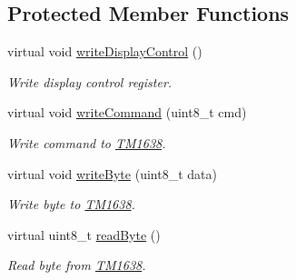 \subsection*{Protected Member Functions}
\begin{DoxyCompactItemize}
\item 
virtual void \hyperlink{class_t_m1638_a2ad9cd6d6c86595868f2c44d61cb1385}{write\+Display\+Control} ()
\begin{DoxyCompactList}\small\item\em Write display control register. \end{DoxyCompactList}\item 
virtual void \hyperlink{class_t_m1638_af72e7da067ca94440bacae4b09337d63}{write\+Command} (uint8\+\_\+t cmd)\hypertarget{class_t_m1638_af72e7da067ca94440bacae4b09337d63}{}\label{class_t_m1638_af72e7da067ca94440bacae4b09337d63}

\begin{DoxyCompactList}\small\item\em Write command to \hyperlink{class_t_m1638}{T\+M1638}. \end{DoxyCompactList}\item 
virtual void \hyperlink{class_t_m1638_a77095cfe4540b143bdca42305c528b2f}{write\+Byte} (uint8\+\_\+t data)
\begin{DoxyCompactList}\small\item\em Write byte to \hyperlink{class_t_m1638}{T\+M1638}. \end{DoxyCompactList}\item 
virtual uint8\+\_\+t \hyperlink{class_t_m1638_a77d2141b59a47d111a344b0b892a5b9c}{read\+Byte} ()
\begin{DoxyCompactList}\small\item\em Read byte from \hyperlink{class_t_m1638}{T\+M1638}. \end{DoxyCompactList}\end{DoxyCompactItemize}
